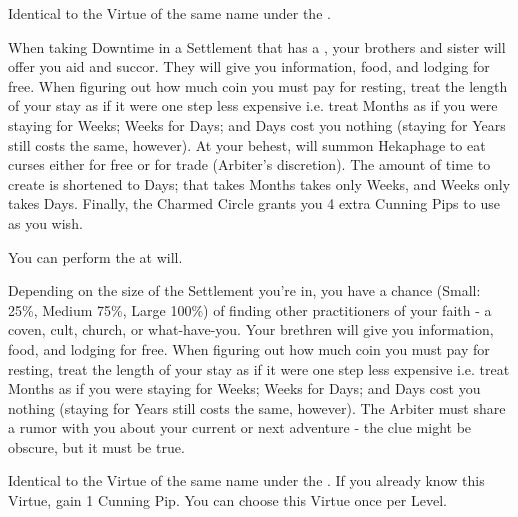 \begin{multicols*}{2}


Identical to the Virtue of the same name under the .



When taking Downtime in a Settlement that has a , your brothers and sister will offer you aid and succor. They will give you information, food, and lodging for free. When figuring out how much coin you must pay for resting, treat the length of your stay as if it were one step less expensive i.e. treat Months as if you were staying for Weeks; Weeks for Days; and Days cost you nothing (staying for Years still costs the same, however). At your behest,  will summon Hekaphage to eat curses either for free or for trade (Arbiter's discretion). The amount of time to create  is shortened to Days;  that takes Months takes only Weeks, and Weeks only takes Days.  Finally, the Charmed Circle grants you 4 extra Cunning Pips to use as you wish.


You can perform the  at will.

\cbreak


Depending on the size of the Settlement you're in, you have a chance (Small: 25\%, Medium 75\%, Large 100\%) of finding other practitioners of your faith - a coven, cult, church, or what-have-you.  Your brethren will give you information, food, and lodging for free. When figuring out how much coin you must pay for resting, treat the length of your stay as if it were one step less expensive i.e. treat Months as if you were staying for Weeks; Weeks for Days; and Days cost you nothing (staying for Years still costs the same, however). The Arbiter must share a rumor with you about your current or next adventure - the clue might be obscure, but it must be true.


Identical to the Virtue of the same name under the . If you already know this Virtue, gain 1 Cunning Pip. You can choose this Virtue once per Level.


\end{multicols*}
